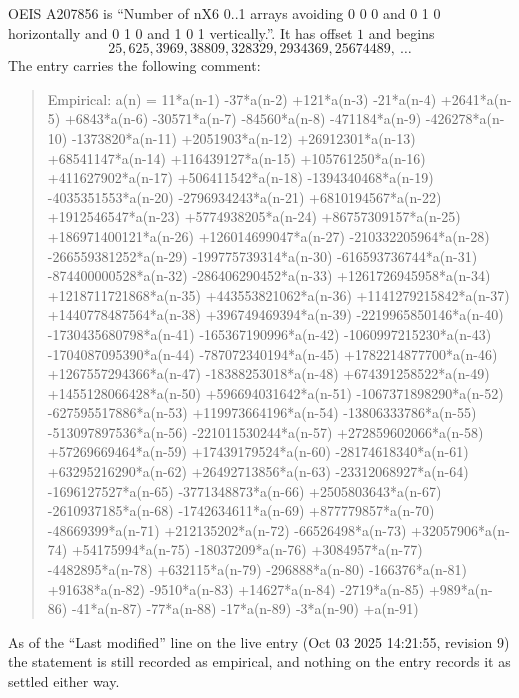 \documentclass[11pt,a4paper]{article}
\theoremstyle{plain}
\theoremstyle{definition}
\begin{document}
OEIS A207856 is ``Number of nX6 0..1 arrays avoiding 0 0 0 and 0 1 0 horizontally and 0 1 0 and 1 0 1 vertically.''. It has offset
$1$ and begins
\[
25, 625, 3969, 38809, 328329, 2934369, 25674489,\ \dots
\]
The entry carries the following comment:
\begin{quote}\small
Empirical: a(n) = 11*a(n-1) -37*a(n-2) +121*a(n-3) -21*a(n-4) +2641*a(n-5) +6843*a(n-6) -30571*a(n-7) -84560*a(n-8) -471184*a(n-9) -426278*a(n-10) -1373820*a(n-11) +2051903*a(n-12) +26912301*a(n-13) +68541147*a(n-14) +116439127*a(n-15) +105761250*a(n-16) +411627902*a(n-17) +506411542*a(n-18) -1394340468*a(n-19) -4035351553*a(n-20) -2796934243*a(n-21) +6810194567*a(n-22) +1912546547*a(n-23) +5774938205*a(n-24) +86757309157*a(n-25) +186971400121*a(n-26) +126014699047*a(n-27) -210332205964*a(n-28) -266559381252*a(n-29) -199775739314*a(n-30) -616593736744*a(n-31) -874400000528*a(n-32) -286406290452*a(n-33) +1261726945958*a(n-34) +1218711721868*a(n-35) +443553821062*a(n-36) +1141279215842*a(n-37) +1440778487564*a(n-38) +396749469394*a(n-39) -2219965850146*a(n-40) -1730435680798*a(n-41) -165367190996*a(n-42) -1060997215230*a(n-43) -1704087095390*a(n-44) -787072340194*a(n-45) +1782214877700*a(n-46) +1267557294366*a(n-47) -18388253018*a(n-48) +674391258522*a(n-49) +1455128066428*a(n-50) +596694031642*a(n-51) -1067371898290*a(n-52) -627595517886*a(n-53) +119973664196*a(n-54) -13806333786*a(n-55) -513097897536*a(n-56) -221011530244*a(n-57) +272859602066*a(n-58) +57269669464*a(n-59) +17439179524*a(n-60) -28174618340*a(n-61) +63295216290*a(n-62) +26492713856*a(n-63) -23312068927*a(n-64) -1696127527*a(n-65) -3771348873*a(n-66) +2505803643*a(n-67) -2610937185*a(n-68) -1742634611*a(n-69) +877779857*a(n-70) -48669399*a(n-71) +212135202*a(n-72) -66526498*a(n-73) +32057906*a(n-74) +54175994*a(n-75) -18037209*a(n-76) +3084957*a(n-77) -4482895*a(n-78) +632115*a(n-79) -296888*a(n-80) -166376*a(n-81) +91638*a(n-82) -9510*a(n-83) +14627*a(n-84) -2719*a(n-85) +989*a(n-86) -41*a(n-87) -77*a(n-88) -17*a(n-89) -3*a(n-90) +a(n-91)
\end{quote}
As of the ``Last modified'' line on the live entry (Oct 03 2025 14:21:55, revision
9) the statement is still recorded as empirical, and nothing on the entry
records it as settled either way.
\end{document}
